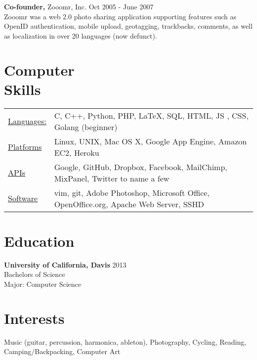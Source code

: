 \documentclass[margin]{res}
\begin{document}
\begin{resume}
 {\bf Co-founder,} Zooomr, Inc. \hfill Oct 2005 - June 2007 \\
  Zooomr was a web 2.0  photo sharing application supporting features such as OpenID authentication, mobile upload, geotagging, trackbacks, comments, as well as localization in over 20 languages (now defunct).

\section{Computer \\ Skills}
   \begin{tabular}{l p{3in}}
   \underline{Languages:} & C, C++, Python, PHP, \LaTeX, SQL, HTML, JS , CSS, Golang (beginner) \\
   \underline{Platforms} & Linux, UNIX, Mac OS X, Google App Engine, Amazon EC2, Heroku\\
   \underline{APIs} & Google, GitHub, Dropbox, Facebook, MailChimp, MixPanel, Twitter to name a few\\
   \underline{Software} & vim, git, Adobe Photoshop, Microsoft Office, OpenOffice.org, Apache Web Server, SSHD\\
 \end{tabular}

\section{Education} 
{\bf University of California, Davis}  \hfill 2013\\
Bachelors of Science \\
Major: Computer Science \\

\section{Interests}
Music (guitar, percussion, harmonica, ableton), Photography, Cycling, Reading, Camping/Backpacking, Computer Art

\end{resume} 
\end{document}
